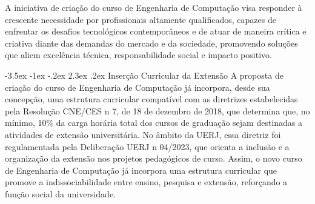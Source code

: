 \documentclass[12pt,a4paper]{article}
\makeatletter
\renewcommand{\section}{\@startsection{section}{1}{\z@}%
      {-3.5ex \@plus -1ex \@minus -.2ex}%
      {2.3ex \@plus.2ex}%
      {\normalfont\normalsize\bfseries}}
\makeatother
\begin{document}
A iniciativa de criação do curso de Engenharia de Computação visa responder à crescente necessidade por profissionais altamente qualificados, capazes de enfrentar os desafios tecnológicos contemporâneos e de atuar de maneira crítica e criativa diante das demandas do mercado e da sociedade, promovendo soluções que aliem excelência técnica, responsabilidade social e impacto positivo.

\section{Inserção Curricular da Extensão}
A proposta de criação do curso de Engenharia de Computação já incorpora, desde sua concepção, uma estrutura curricular compatível com as diretrizes estabelecidas pela Resolução CNE/CES n\textordmasculine{} 7, de 18 de dezembro de 2018, que determina que, no mínimo, 10\% da carga horária total dos cursos de graduação sejam destinadas a atividades de extensão universitária. No âmbito da UERJ, essa diretriz foi regulamentada pela Deliberação UERJ n\textordmasculine{} 04/2023, que orienta a inclusão e a organização da extensão nos projetos pedagógicos de curso. Assim, o novo curso de Engenharia de Computação já incorpora uma estrutura curricular que promove a indissociabilidade entre ensino, pesquisa e extensão, reforçando a função social da universidade.
\end{document}
